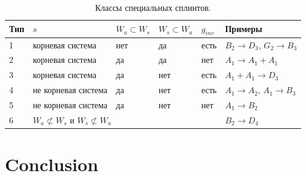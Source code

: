 \documentclass{article}
\begin{document}
\begin{table}[h]
\begin{tabular}[t]{|p{2em}|p{6em}|p{5em}|p{5em}|p{2em}|p{6em}|}
\hline
Тип & $s$ & $W_a\subset W_s$ & $W_s\subset W_a$ & $g_{inv} $ & Примеры \\
\hline
1 & корневая система & нет & да & есть  & $B_2\rightarrow D_3$, $G_2\rightarrow B_3$\\
\hline
2 & корневая система  & да & да & нет & $A_1\rightarrow A_1+A_1$ \\
\hline
3 & корневая система  & да & нет & есть & $A_1+A_1\rightarrow D_3$ \\
\hline
4 & не корневая система  & да & нет & есть & $A_1\rightarrow A_2$, $A_1\rightarrow B_3$\\
\hline
5 & не корневая система  & да & нет & нет  & $A_1\rightarrow B_2$\\
\hline
6 & \multicolumn{4}{|l|}{$W_a\not\subset W_s$ и $W_s\not\subset W_a$} & $B_2\rightarrow D_4$\\
\hline
\end{tabular}
\caption{Классы специальных сплинтов.}
\label {spsp}
\end{table}


\section*{Conclusion}
\label{sec:conclusion}


{} 

\end{document}
